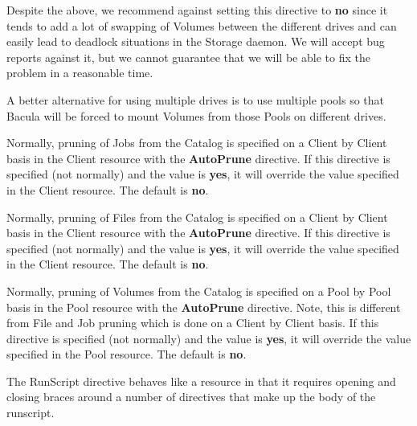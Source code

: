 \begin{description}
   Despite the above, we recommend against setting this directive to
   {\bf no} since
   it tends to add a lot of swapping of Volumes between the different
   drives and can easily lead to deadlock situations in the Storage
   daemon. We will accept bug reports against it, but we cannot guarantee
   that we will be able to fix the problem in a reasonable time.

   A better alternative for using multiple drives is to use multiple
   pools so that Bacula will be forced to mount Volumes from those Pools
   on different drives.

\item [Prune Jobs = \lt{}yes\vb{}no\gt{}]
   Normally, pruning of Jobs from the Catalog is specified on a Client by
   Client basis in the Client resource with the {\bf AutoPrune} directive.
   If this directive is specified (not normally) and the value is {\bf
   yes}, it will override the value specified in the Client resource.  The
   default is {\bf no}.


\item [Prune Files = \lt{}yes\vb{}no\gt{}]
   Normally, pruning of Files from the Catalog is specified on a Client by
   Client basis in the Client resource with the {\bf AutoPrune} directive.
   If this directive is specified (not normally) and the value is {\bf
   yes}, it will override the value specified in the Client resource.  The
   default is {\bf no}.

\item [Prune Volumes = \lt{}yes\vb{}no\gt{}]
   Normally, pruning of Volumes from the Catalog is specified on a Pool by
   Pool basis in the Pool resource with the {\bf AutoPrune} directive.
   Note, this is different from File and Job pruning which is done on a
   Client by Client basis.  If this directive is specified (not normally)
   and the value is {\bf yes}, it will override the value specified in the
   Pool resource.  The default is {\bf no}.

\item [RunScript \{\lt{}body-of-runscript\gt{}\}]

   The RunScript directive behaves like a resource in that it
   requires opening and closing braces around a number of directives
   that make up the body of the runscript.


\end{description}
